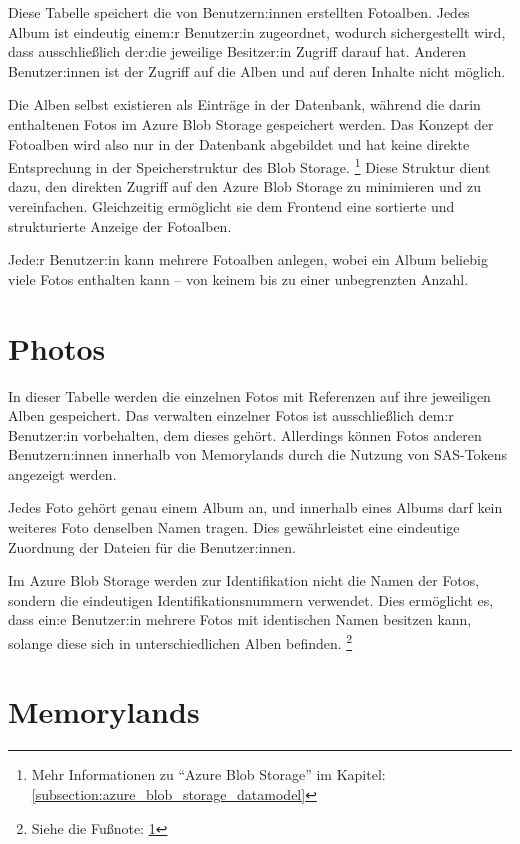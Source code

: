Diese Tabelle speichert die von Benutzern:innen erstellten Fotoalben. Jedes Album ist eindeutig einem:r 
Benutzer:in zugeordnet, wodurch sichergestellt wird, dass ausschließlich der:die jeweilige Besitzer:in 
Zugriff darauf hat. Anderen Benutzer:innen ist der Zugriff auf die Alben und auf deren Inhalte
nicht möglich.

Die Alben selbst existieren als Einträge in der Datenbank, während die darin enthaltenen Fotos 
im Azure Blob Storage gespeichert werden. Das Konzept der Fotoalben wird also nur in der Datenbank 
abgebildet und hat keine direkte Entsprechung in der Speicherstruktur des Blob Storage. \footnote{\label{azure-blob-storage-note}Mehr Informationen zu ``Azure Blob Storage'' im Kapitel: \ref{subsection:azure_blob_storage_datamodel}}
Diese Struktur dient dazu, den direkten Zugriff auf den Azure Blob Storage zu minimieren und 
zu vereinfachen. Gleichzeitig ermöglicht sie dem Frontend eine sortierte und strukturierte 
Anzeige der Fotoalben.

Jede:r Benutzer:in kann mehrere Fotoalben anlegen, wobei ein Album beliebig viele Fotos enthalten 
kann -- von keinem bis zu einer unbegrenzten Anzahl.

\section{Photos}

In dieser Tabelle werden die einzelnen Fotos mit Referenzen auf ihre jeweiligen Alben gespeichert. 
Das verwalten einzelner Fotos ist ausschließlich dem:r Benutzer:in vorbehalten, dem dieses gehört. 
Allerdings können Fotos anderen Benutzern:innen innerhalb von Memorylands durch die Nutzung von 
SAS-Tokens angezeigt werden.

Jedes Foto gehört genau einem Album an, und innerhalb eines Albums darf kein weiteres 
Foto denselben Namen tragen. Dies gewährleistet eine eindeutige Zuordnung der Dateien für die
Benutzer:innen.

Im Azure Blob Storage werden zur Identifikation nicht die Namen der Fotos, sondern die 
eindeutigen Identifikationsnummern verwendet. Dies ermöglicht es, dass ein:e Benutzer:in mehrere
Fotos mit identischen Namen besitzen kann, solange diese sich in unterschiedlichen Alben befinden.
\footnote{Siehe die Fußnote: \ref{azure-blob-storage-note}}

\section{Memorylands}

